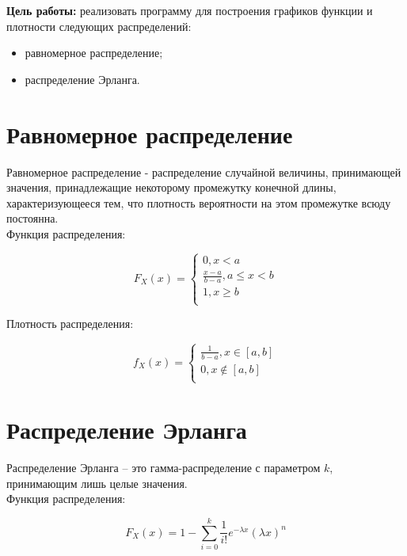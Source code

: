\documentclass[a4paper, 14pt]{article}
\begin{document}
	\textbf{Цель работы:} реализовать программу для построения графиков функции и плотности следующих распределений:
\begin{itemize}
\item равномерное распределение;
\item распределение Эрланга. 
\end{itemize}
	
	
	\section*{Равномерное распределение}
	
Равномерное распределение - распределение случайной величины, принимающей значения, принадлежащие некоторому промежутку конечной длины, характеризующееся тем, что плотность вероятности на этом промежутке всюду постоянна.\\

Функция распределения:

\begin{equation*}
F_X (x) =
    \begin{cases}
        0, x < a \\
        \frac{x - a}{b - a}, a \le x < b \\
        1, x \geq b \\
    \end{cases}
\end{equation*}
	
Плотность распределения:

\begin{equation*}
    f_X (x) =
    \begin{cases}
        \frac{1}{b-a}, x \in [a,b] \\
        0, x \notin [a, b] \\
    \end{cases}
\end{equation*}


\section*{Распределение Эрланга}

Распределение Эрланга – это гамма-распределение  с параметром $k$, принимающим лишь целые значения. \\

Функция распределения:

\begin{equation*}
F_X(x) = 1 - \sum_{i=0}^k  \frac{1}{i!} e^{-\lambda x} (\lambda x)^n
\end{equation*}
	
\end{document}
